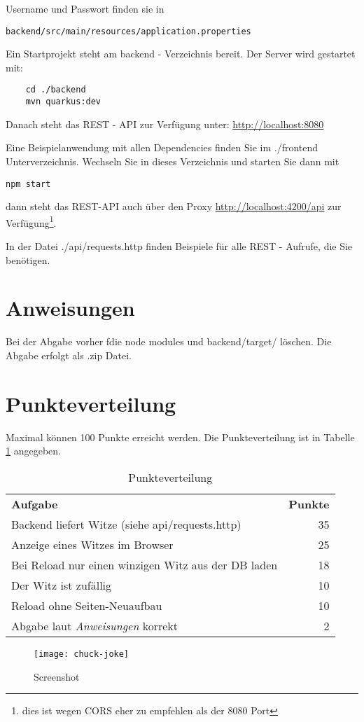\documentclass[a4paper, 11pt]{article}
\begin{document}
Username und Passwort finden sie in \begin{verbatim}backend/src/main/resources/application.properties\end{verbatim}

Ein Startprojekt steht am backend - Verzeichnis bereit. 
Der Server wird gestartet mit:
\begin{verbatim}
	cd ./backend
	mvn quarkus:dev
\end{verbatim}
Danach steht das REST - API zur Verfügung unter:
\href{http://localhost:8080}{http://localhost:8080}

Eine Beispielanwendung mit allen Dependencies finden Sie im ./frontend Unterverzeichnis.
Wechseln Sie in dieses Verzeichnis und starten Sie dann mit
\begin{verbatim}
npm start
\end{verbatim}

dann steht das REST-API auch über den Proxy 
\href{http://localhost:4200/api}{http://localhost:4200/api} zur Verfügung\footnote{dies ist wegen CORS eher zu empfehlen als der 8080 Port}.

In der Datei ./api/requests.http finden Beispiele für alle REST - Aufrufe, die Sie benötigen. 
\section{Anweisungen}

Bei der Abgabe vorher fdie node modules und backend/target/ löschen. Die Abgabe erfolgt als .zip Datei.


\section{Punkteverteilung}
Maximal können 100 Punkte erreicht werden. Die Punkteverteilung ist in Tabelle \ref{tab:points} angegeben.
\begin{table}[ht]
\centering
\caption{Punkteverteilung}

\begin{tabular}{| l | r |} \cline{1-2} 
\textbf{Aufgabe} &  \textbf{Punkte}  \\ \cline{1-2}
Backend liefert Witze (siehe api/requests.http) & 35 \\ \cline{1-2}
Anzeige eines Witzes im Browser & 25 \\ \cline{1-2}
Bei Reload nur einen winzigen Witz aus der DB laden & 18 \\ \cline{1-2}
Der Witz ist zufällig & 10 \\ \cline{1-2}
Reload ohne Seiten-Neuaufbau & 10 \\ \cline{1-2}
Abgabe laut \textit{Anweisungen} korrekt & 2 \\ \cline{1-2}
\end{tabular}
\label{tab:points}
\end{table}

\begin{figure}
	\center
	\texttt{[image: chuck-joke]}
	\caption{Screenshot}
	\label{fig:img}
\end{figure}
\end{document}
